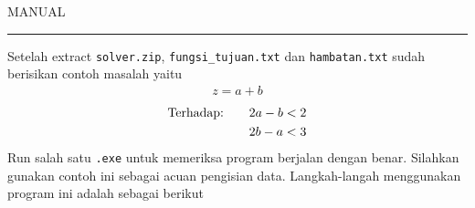 \documentclass[12pt]{article}
\newcommand{\inline}[1]{\lstinline[basicstyle=\footnotesize\color{black}\ttfamily]|#1|}
\begin{document}
\begin{center}
    MANUAL
\end{center}
\noindent\rule{\textwidth}{0.2pt}\bigbreak

\noindent
Setelah extract \inline{solver.zip}, \inline{fungsi_tujuan.txt} dan \inline{hambatan.txt} sudah berisikan contoh masalah yaitu
\begin{align*}
    z = a + b
\end{align*}
\begin{align*}
    \text{Terhadap:\qquad}    & 2a - b < 2 \\
                        & 2b - a < 3
\end{align*}
Run salah satu \inline{.exe} untuk memeriksa program berjalan dengan benar. Silahkan gunakan contoh ini sebagai acuan pengisian data. Langkah-langah menggunakan program ini adalah sebagai berikut
\end{document}

